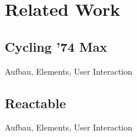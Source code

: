 \chapter{Related Work}
	 
\section{Cycling '74 Max}
		
Aufbau, Elements, User Interaction

\section{Reactable}

Aufbau, Elements, User Interaction